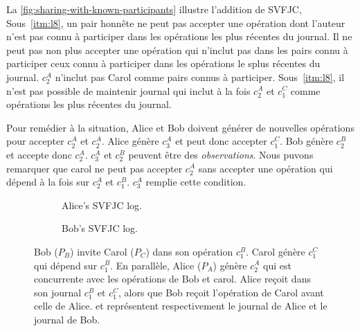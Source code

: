 La \autoref{fig:sharing-with-known-participants} illustre l'addition de \ac{SVFJC},
Sous~\ref{itm:l8}, un pair honnête ne peut pas accepter une opération dont l'auteur n'est pas connu à participer dans les opérations les plus récentes du journal.
Il ne peut pas non plus accepter une opération qui n'inclut pas dans les pairs connu à participer ceux connu à participer dans les opérations le splus récentes du journal.
$c^A_2$ n'inclut pas Carol comme pairs connus à participer.
Sous~\ref{itm:l8}, il n'est pas possible de maintenir journal qui inclut à la fois $c^A_2$ et $c^C_1$ comme opérations les plus récentes du journal.

Pour remédier à la situation, Alice et Bob doivent générer de nouvelles opérations pour accepter $c^A_2$ et $c^A_2$.
Alice génère $c^A_3$ et peut donc accepter $c^C_1$.
Bob génère $c^B_2$ et accepte donc $c^A_2$.
$c^A_3$ et $c^B_2$ peuvent être des \emph{observations}.
Nous puvons remarquer que carol ne peut pas accepter $c^A_2$ sans accepter une opération qui dépend à la fois sur $c^A_2$ et $c^B_1$.
$c^A_3$ remplie cette condition.

\begin{figure}[ht]
  \centering
  \begin{subfigure}{0.48\linewidth}
    \centering
    \begin{utikzhbgraph}
    \end{utikzhbgraph}
    \caption{Alice's \acs{SVFJC} log.}\label{fig:sharing-with-known-participants-alice}
  \end{subfigure}
  \begin{subfigure}{0.48\linewidth}
    \centering
    \begin{utikzhbgraph}
    \end{utikzhbgraph}
    \caption{Bob's \acs{SVFJC} log.}\label{fig:sharing-with-known-participants-bob}
  \end{subfigure}
  \caption{Bob ($P_B$) invite Carol ($P_C$) dans son opération $c^B_1$.
  Carol génère $c^C_1$  qui dépend sur $c^B_1$.
  En parallèle, Alice ($P_A$) génère $c^A_2$ qui est concurrente avec les opérations de Bob et carol.
  Alice reçoit dans son journal $c^B_1$ et $c^C_1$, alors que Bob reçoit l'opération de Carol avant celle de Alice. 
   et  représentent respectivement le journal de Alice et le journal de Bob.}\label{fig:sharing-with-known-participants}
\end{figure}

